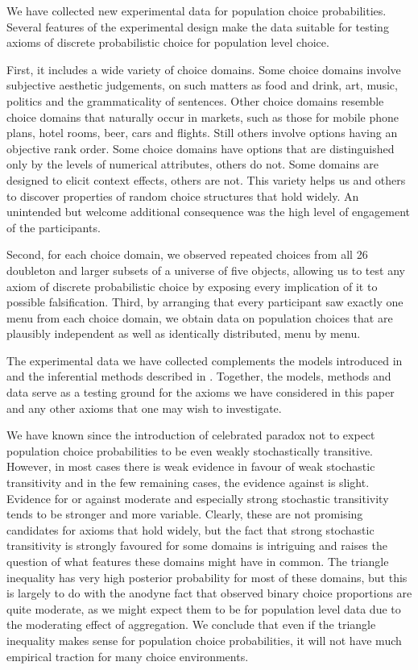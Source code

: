 \documentclass[11pt,letter]{article}
\newcommand{\menu}{menu}
\begin{document}
We have collected new experimental data for population choice probabilities.
Several features of the experimental design make the data suitable for testing axioms of discrete probabilistic choice for population level choice.

First, it includes a wide variety of choice domains.
Some choice domains involve subjective aesthetic judgements, on such matters as food and drink, art, music, politics and the grammaticality of sentences.
Other choice domains resemble choice domains that naturally occur in markets, such as those for mobile phone plans, hotel rooms, beer, cars and flights.
Still others involve options having an objective rank order.
Some choice domains have options that are distinguished only by the levels of numerical attributes, others do not.
Some domains are designed to elicit context effects, others are not.
This variety helps us and others to discover properties of random choice structures that hold widely.
An unintended but welcome additional consequence was the high level of engagement of the participants.

Second, for each choice domain, we observed repeated choices from all 26 doubleton and larger subsets of a universe of five objects, allowing us to test any axiom of discrete probabilistic choice by exposing every implication of it to possible falsification.
Third, by arranging that every participant saw exactly one \menu{} from each choice domain, we obtain data on population choices that are plausibly independent as well as identically distributed, \menu{} by \menu{}.

The experimental data we have collected complements the models introduced in  and the inferential methods described in .
Together, the models, methods and data serve as a testing ground for the axioms we have considered in this paper and any other axioms that one may wish to investigate.

We have known since the introduction of  celebrated paradox not to expect population choice probabilities to be even weakly stochastically transitive.
However, in most cases there is weak evidence in favour of weak stochastic transitivity and in the few remaining cases, the evidence against is slight.
Evidence for or against moderate and especially strong stochastic transitivity tends to be stronger and more variable.
Clearly, these are not promising candidates for axioms that hold widely, but the fact that strong stochastic transitivity is strongly favoured for some domains is intriguing and raises the question of what features these domains might have in common.
The triangle inequality has very high posterior probability for most of these domains, but this is largely to do with the anodyne fact that observed binary choice proportions are quite moderate, as we might expect them to be for population level data due to the moderating effect of aggregation.
We conclude that even if the triangle inequality makes sense for population choice probabilities, it will not have much empirical traction for many choice environments.
\end{document}
